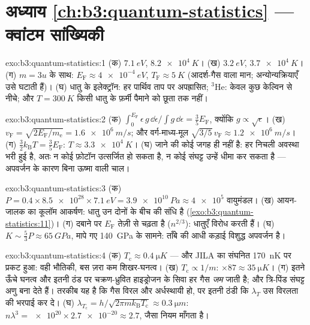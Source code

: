\section*{अध्याय \ref{ch:b3:quantum-statistics} --- क्वांटम सांख्यिकी}

\begin{solution}{exo:b3:quantum-statistics:1}
(क) $\qty{7.1}{eV}$, $\qty{8.2e4}{K}$। (ख) $\qty{3.2}{eV}$,
$\qty{3.7e4}{K}$। (ग) $m = 3u$ के साथ: $E_{\text{F}} \approx
\qty{4e-4}{eV}$, $T_{\text{F}} \approx \qty{5}{K}$ (आदर्श-गैस
वाला मान; अन्योन्यक्रियाएँ उसे घटाती हैं)। (घ) धातु के इलेक्ट्रॉन:
हर पार्थिव ताप पर अपह्रासित; $^3$He: केवल कुछ केल्विन से नीचे; और
$T = \qty{300}{K}$ किसी धातु के फ़र्मी पैमाने को छूता तक नहीं।
\end{solution}

\begin{solution}{exo:b3:quantum-statistics:2}
(क) $\int_0^{E_{\text{F}}}\epsilon\,g\,\dd\epsilon/\int g\,\dd
\epsilon = \tfrac35 E_{\text{F}}$, क्योंकि $g \propto \sqrt\epsilon$।
(ख) $v_{\text{F}} = \sqrt{2E_{\text{F}}/m_{\text{e}}} =
\qty{1.6e6}{m/s}$; और वर्ग-माध्य-मूल $\sqrt{3/5}\,v_{\text{F}} \approx
\qty{1.2e6}{m/s}$। (ग) $\tfrac32 k_{\text{B}}T = \tfrac35
E_{\text{F}}$: $T \approx \qty{3.3e4}{K}$। (घ) जाने की कोई जगह ही
नहीं है: हर निचली अवस्था भरी हुई है, अतः न कोई फ़ोटॉन उत्सर्जित हो
सकता है, न कोई संघट्ट उन्हें धीमा कर सकता है --- अपवर्जन के कारण
बिना ऊष्मा वाली चाल।
\end{solution}

\begin{solution}{exo:b3:quantum-statistics:3}
(क) $P = 0.4 \times \num{8.5e28} \times \qty{7.1}{eV} =
\qty{3.9e10}{Pa} \approx \num{4e5}$ वायुमंडल। (ख) आयन-जालक का
कूलॉम आकर्षण: धातु उन दोनों के बीच की संधि है
(\cref{exo:b3:quantum-statistics:11})। (ग) दबाने पर
$E_{\text{F}}$ तेज़ी से चढ़ता है ($n^{2/3}$): धातुएँ विरोध करती
हैं। (घ) $K \sim
\tfrac53 P \approx \qty{65}{GPa}$, मापे गए
\qty{140}{GPa} के सामने: ताँबे की आधी कड़ाई विशुद्ध अपवर्जन है।
\end{solution}

\begin{solution}{exo:b3:quantum-statistics:4}
(क) $T_{\text{c}} \approx \qty{0.4}{\micro K}$ --- और JILA का
संघनित \qty{170}{nK} पर प्रकट हुआ: वही भौतिकी, बस ज़रा कम
शिखर-घनत्व। (ख) $T_{\text{c}} \propto 1/m$: $\times87 \approx
\qty{35}{\micro K}$। (ग) इतने ऊँचे घनत्व और इतनी ठंड पर
चक्रण-ध्रुवित हाइड्रोजन के सिवा हर गैस \emph{जम} जाती है; और
त्रि-पिंड संघट्ट अणु बना देते हैं। तरकीब यह है कि गैस विरल और
अर्धस्थायी हो, पर इतनी ठंडी कि $\lambda_T$ उस विरलता की भरपाई कर
दे। (घ)
$\lambda_{T_{\text{c}}} = h/\sqrt{2\pi mk_{\text{B}}T_{\text{c}}}
\approx \qty{0.3}{\micro m}$: $n\lambda^3 = \num{e20} \times
\num{2.7e-20} \approx 2.7$, जैसा नियम माँगता है।
\end{solution}

